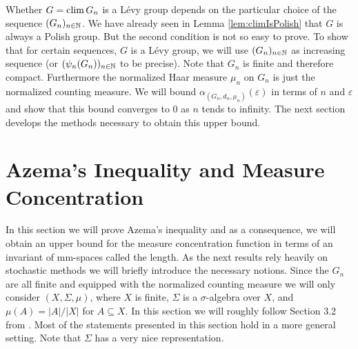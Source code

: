 Whether $G=\operatorname{clim} G_n$ is a L\'evy group depends on the particular choice of the sequence $(G_n)_{n\in\mathbb{N}}$. We have already seen in Lemma \ref{lem:climIsPolish} that $G$ is always a Polish group. But the second condition is not so easy to prove.
To show that for certain sequences, $G$ is a L\'evy group, we will use $(G_n)_{n\in\mathbb{N}}$ as increasing sequence (or $(\psi_n(G_n))_{n\in\mathbb{N}}$ to be precise). Note that $G_n$ is finite and therefore compact. Furthermore the normalized Haar measure $\mu_n$ on $G_n$ is just the normalized counting measure. We will bound $\alpha_{(G_n,d_n,\mu_n)}(\varepsilon)$ in terms of $n$ and $\varepsilon$ and show that this bound converges to 0 as $n$ tends to infinity. 
The next section develops the methods necessary to obtain this upper bound.
		
		
\section{Azema's Inequality and Measure Concentration}\label{sec:azema}
In this section we will prove Azema's inequality and as a consequence, we will obtain an upper bound for the measure concentration function in terms of an invariant of mm-spaces called the length. As the next results rely heavily on stochastic methods we will briefly introduce the necessary notions. Since the $G_n$ are all finite and equipped with the normalized counting measure we will only consider  $(X,\Sigma,\mu)$, where $X$ is finite, $\Sigma$ is a $\sigma$-algebra over $X$, and $\mu(A)=|A|/|X|$ for $A\subseteq X$. In this section we will roughly follow Section 3.2 from \cite{Azema}. Most of the statements presented in this section hold in a more general setting. Note that $\Sigma$ has a very nice representation.%
		
